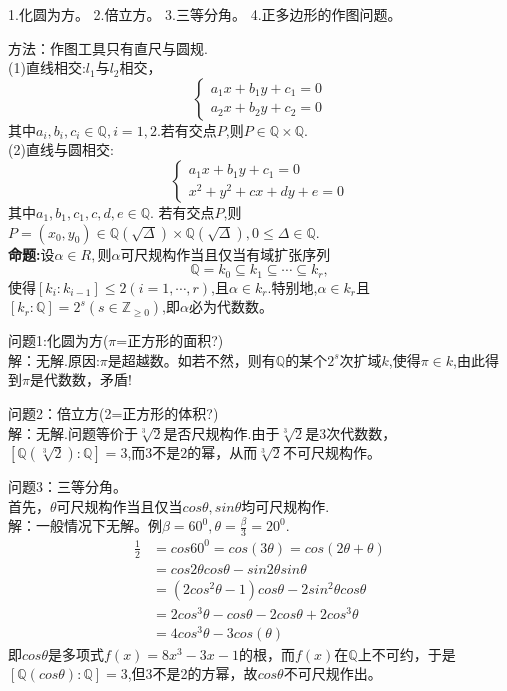\documentclass[UTF8]{article}
\begin{document}
1.化圆为方。
2.倍立方。
3.三等分角。
4.正多边形的作图问题。


方法：作图工具只有直尺与圆规.\\
(1)直线相交:$l_{1}$与$l_{2}$相交，
\begin{displaymath}
\left\{ 
\begin{array}{ll}
a_{1}x+b_{1}y+c_{1}=0\\
a_{2}x+b_{2}y+c_{2}=0
\end{array}
\right.
\end{displaymath}
其中$a_{i},b_{i},c_{i}\in \mathbb{Q},i=1,2$.若有交点$P$,则$P\in \mathbb{Q}\times\mathbb{Q}.$\\
(2)直线与圆相交:
\begin{displaymath}
\left\{ 
\begin{array}{ll}
a_{1}x+b_{1}y+c_{1}=0\\
x^{2}+y^{2}+cx+dy+e=0
\end{array}
\right.
\end{displaymath}
其中$a_{1},b_{1},c_{1},c,d,e\in \mathbb{Q}.$
若有交点$P$,则$P=(x_{0},y_{0})\in \mathbb{Q}(\sqrt{\Delta})\times\mathbb{Q}(\sqrt{\Delta}) ,0\leq \Delta\in \mathbb{Q}$.\\
\textbf{命题:}设$\alpha\in R,$则$\alpha$可尺规构作当且仅当有域扩张序列
$$\mathbb{Q}=k_{0}\subseteq k_{1}\subseteq \cdots\subseteq k_{r},
$$
使得$[k_{i}:k_{i-1}]\leq 2(i=1,\cdots,r)$,且$\alpha\in k_{r}.$特别地,$\alpha\in k_{r}$且$[k_{r}:\mathbb{Q}]=2^{s}(s\in \mathbb{Z}_{\geq 0})$,即$\alpha$必为代数数。


问题1:化圆为方($\pi$=正方形的面积?)\\
解：无解.原因:$\pi$是超越数。如若不然，则有$\mathbb{Q}$的某个$2^{s}$次扩域$k$,使得$\pi\in k$,由此得到$\pi$是代数数，矛盾!


问题2：倍立方(2=正方形的体积?)\\
解：无解.问题等价于$\sqrt[3]{2}$是否尺规构作.由于$\sqrt[3]{2}$是3次代数数，$[\mathbb{Q}(\sqrt[3]{2}):\mathbb{Q}]=3$,而$3$不是$2$的幂，从而$\sqrt[3]{2}$不可尺规构作。


问题3：三等分角。\\
首先，$\theta$可尺规构作当且仅当$cos\theta,sin\theta$均可尺规构作.\\
解：一般情况下无解。例$\beta=60^{0},\theta=\frac{\beta}{3}=20^{0}.$
\[
\begin{split}
\frac{1}{2}&=cos60^{0}=cos(3\theta)=cos(2\theta+\theta)\\
&=cos2\theta cos\theta-sin2\theta sin \theta\\
&=(2cos^{2}\theta-1)cos\theta-2sin^{2}\theta cos\theta\\
&=2cos^{3}\theta-cos\theta-2cos\theta+2cos^{3}\theta\\
&=4cos^{3}\theta-3cos(\theta)
\end{split}
\]
即$cos\theta$是多项式$f(x)=8x^{3}-3x-1$的根，而$f(x)$在$\mathbb{Q}$上不可约，于是$[\mathbb{Q}(cos\theta):\mathbb{Q}]=3$,但3不是2的方幂，故$cos\theta$不可尺规作出。
\end{document}
